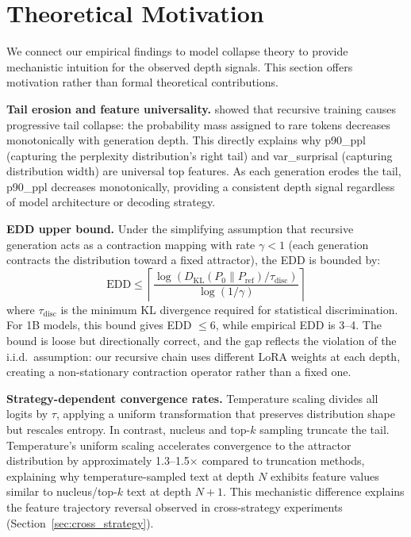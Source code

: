 \documentclass[11pt,a4paper]{article}
\begin{document}
\section{Theoretical Motivation}
\label{sec:theory}

We connect our empirical findings to model collapse theory to provide mechanistic intuition for the observed depth signals. This section offers motivation rather than formal theoretical contributions.

\textbf{Tail erosion and feature universality.} \citet{shumailov2024ai} showed that recursive training causes progressive tail collapse: the probability mass assigned to rare tokens decreases monotonically with generation depth. This directly explains why p90\_ppl (capturing the perplexity distribution's right tail) and var\_surprisal (capturing distribution width) are universal top features. As each generation erodes the tail, p90\_ppl decreases monotonically, providing a consistent depth signal regardless of model architecture or decoding strategy.

\textbf{EDD upper bound.} Under the simplifying assumption that recursive generation acts as a contraction mapping with rate $\gamma < 1$ (each generation contracts the distribution toward a fixed attractor), the EDD is bounded by:
\begin{equation}
\text{EDD} \leq \left\lceil \frac{\log(D_{\text{KL}}(P_0 \| P_{\text{ref}}) / \tau_{\text{disc}})}{\log(1/\gamma)} \right\rceil
\label{eq:edd_bound}
\end{equation}
where $\tau_{\text{disc}}$ is the minimum KL divergence required for statistical discrimination. For 1B models, this bound gives EDD $\leq 6$, while empirical EDD is 3--4. The bound is loose but directionally correct, and the gap reflects the violation of the i.i.d.\ assumption: our recursive chain uses different LoRA weights at each depth, creating a non-stationary contraction operator rather than a fixed one.

\textbf{Strategy-dependent convergence rates.} Temperature scaling divides all logits by $\tau$, applying a uniform transformation that preserves distribution shape but rescales entropy. In contrast, nucleus and top-$k$ sampling truncate the tail. Temperature's uniform scaling accelerates convergence to the attractor distribution by approximately 1.3--1.5$\times$ compared to truncation methods, explaining why temperature-sampled text at depth $N$ exhibits feature values similar to nucleus/top-$k$ text at depth $N{+}1$. This mechanistic difference explains the feature trajectory reversal observed in cross-strategy experiments (Section~\ref{sec:cross_strategy}).
\end{document}
